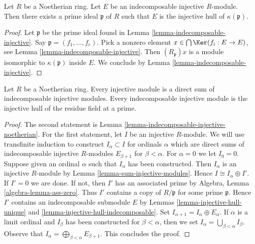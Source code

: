 \begin{lemma}
\label{lemma-indecomposable-injective-noetherian}
Let $R$ be a Noetherian ring. Let $E$ be an indecomposable injective
$R$-module. Then there exists a prime ideal $\mathfrak p$ of $R$ such that
$E$ is the injective hull of $\kappa(\mathfrak p)$.
\end{lemma}

\begin{proof}
Let $\mathfrak p$ be the prime ideal found in
Lemma \ref{lemma-indecomposable-injective}.
Say $\mathfrak p = (f_1, \ldots, f_r)$.
Pick a nonzero element $x \in \bigcap \Ker(f_i : E \to E)$,
see Lemma \ref{lemma-indecomposable-injective}.
Then $(R_\mathfrak p)x$ is a module isomorphic to $\kappa(\mathfrak p)$
inside $E$. We conclude by Lemma \ref{lemma-indecomposable-injective}.
\end{proof}

\begin{proposition}
\label{proposition-structure-injectives-noetherian}
Let $R$ be a Noetherian ring.
Every injective module is a direct sum of indecomposable injective modules.
Every indecomposable injective module is the injective hull of
the residue field at a prime.
\end{proposition}

\begin{proof}
The second statement is Lemma \ref{lemma-indecomposable-injective-noetherian}.
For the first statement, let $I$ be an injective $R$-module.
We will use transfinite induction to construct $I_\alpha \subset I$
for ordinals $\alpha$ which are direct sums of indecomposable injective
$R$-modules $E_{\beta + 1}$ for $\beta < \alpha$.
For $\alpha = 0$ we let $I_0 = 0$. Suppose given an ordinal $\alpha$
such that $I_\alpha$ has been constructed. Then $I_\alpha$ is an
injective $R$-module by Lemma \ref{lemma-sum-injective-modules}.
Hence $I \cong I_\alpha \oplus I'$. If $I' = 0$ we are done.
If not, then $I'$ has an associated prime by
Algebra, Lemma \ref{algebra-lemma-ass-zero}.
Thus $I'$ contains a copy of $R/\mathfrak p$ for some prime $\mathfrak p$.
Hence $I'$ contains an indecomposable submodule $E$ by
Lemmas \ref{lemma-injective-hull-unique} and
\ref{lemma-injective-hull-indecomposable}. Set
$I_{\alpha + 1} = I_\alpha \oplus E_\alpha$.
If $\alpha$ is a limit ordinal and $I_\beta$ has been constructed
for $\beta < \alpha$, then we set
$I_\alpha = \bigcup_{\beta < \alpha} I_\beta$.
Observe that $I_\alpha = \bigoplus_{\beta < \alpha} E_{\beta + 1}$.
This concludes the proof.
\end{proof}




